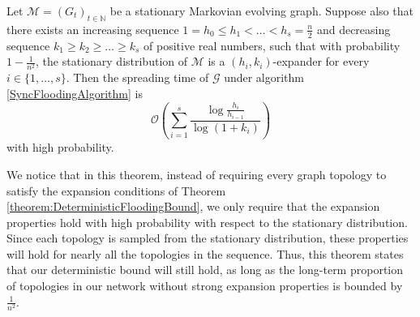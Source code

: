 
\begin{theorem}
	Let $\mathcal{M} = (G_t)_{t \in \mathbb{N}}$  be a stationary Markovian evolving graph. Suppose also that there exists an increasing sequence $1 = h_0 \leq h_1 < \dots < h_s = \frac{n}{2}$ and decreasing sequence $k_1 \geq k_2 \geq \dots \geq k_s$ of positive real numbers, such that with probability $1-\frac{1}{n^2}$, the stationary distribution of $\mathcal{M}$ is a $(h_i, k_i)$-expander for every $i \in \{1, \dots , s\}$. Then the spreading time of $\mathcal{G}$ under algorithm \ref{SyncFloodingAlgorithm} is
	$$
		\mathcal{O}\left(\sum_{i=1}^s \frac{\log \frac{h_i}{h_{i-1}}}{\log(1+k_i)}\right)
	$$
	with high probability.
\end{theorem}

We notice that in this theorem, instead of requiring every graph topology to satisfy the expansion conditions of Theorem \ref{theorem:DeterministicFloodingBound}, we only require that the expansion properties hold with high probability with respect to the stationary distribution. Since each topology is sampled from the stationary distribution, these properties will hold for nearly all the topologies in the sequence. Thus, this theorem states that our deterministic bound will still hold, as long as the long-term proportion of topologies in our network without strong expansion properties is bounded by $\frac{1}{n^2}$.


